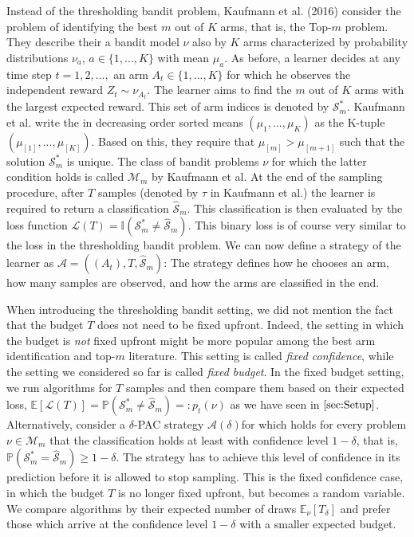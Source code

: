 \documentclass[11pt,]{article}
\begin{document}
Instead of the thresholding bandit problem, Kaufmann et al. (2016)
consider the problem of identifying the best \(m\) out of \(K\) arms,
that is, the Top-\(m\) problem. They describe their a bandit model
\(\nu\) also by \(K\) arms characterized by probability distributions
\(\nu_a\), \(a \in \{1,...,K\}\) with mean \(\mu_a\). As before, a
learner decides at any time step \(t=1,2,...,\) an arm
\(A_t \in \{1,...,K\}\) for which he observes the independent reward
\(Z_{t} \sim \nu_{A_t}\). The learner aims to find the \(m\) out of
\(K\) arms with the largest expected reward. This set of arm indices is
denoted by \(\mathcal{S}_m^*\). Kaufmann et al. write the in decreasing
order sorted means \((\mu_{1}, ..., \mu_{K})\) as the K-tuple
\((\mu_{[1]}, ..., \mu_{[K]})\). Based on this, they require that
\(\mu_{[m]} > \mu_{[m+1]}\) such that the solution \(\mathcal{S}_m^*\)
is unique. The class of bandit problems \(\nu\) for which the latter
condition holds is called \(\mathcal{M}_m\) by Kaufmann et al. At the
end of the sampling procedure, after \(T\) samples (denoted by \(\tau\)
in Kaufmann et al.) the learner is required to return a classification
\(\hat{\mathcal{S}}_m\). This classification is then evaluated by the
loss function
\(\mathcal{L}(T) = \mathbb{I}(\mathcal{S}^*_m \neq \hat{\mathcal{S}}_m)\).
This binary loss is of course very similar to the loss in the
thresholding bandit problem. We can now define a strategy of the learner
as \(\mathcal{A} = ((A_t), T, \hat{\mathcal{S}}_m)\): The strategy
defines how he chooses an arm, how many samples are observed, and how
the arms are classified in the end.

When introducing the thresholding bandit setting, we did not mention the
fact that the budget \(T\) does not need to be fixed upfront. Indeed,
the setting in which the budget is \emph{not} fixed upfront might be
more popular among the best arm identification and top-\(m\) literature.
This setting is called \emph{fixed confidence}, while the setting we
considered so far is called \emph{fixed budget}. In the fixed budget
setting, we run algorithms for \(T\) samples and then compare them based
on their expected loss,
\(\mathbb{E}[\mathcal{L}(T)] = \mathbb{P}(\mathcal{S}^*_m \neq \hat{\mathcal{S}}_m) =: p_t(\nu)\)
as we have seen in \(\autoref{sec:Setup}\). Alternatively, consider a
\(\delta\)-PAC strategy \(\mathcal{A}(\delta)\)for which holds for every
problem \(\nu \in \mathcal{M}_m\) that the classification holds at least
with confidence level \(1-\delta\), that is,
\(\mathbb{P}(\mathcal{S}^*_m = \hat{\mathcal{S}}_m) \geq 1-\delta\). The
strategy has to achieve this level of confidence in its prediction
before it is allowed to stop sampling. This is the fixed confidence
case, in which the budget \(T\) is no longer fixed upfront, but becomes
a random variable. We compare algorithms by their expected number of
draws \(\mathbb{E}_{\nu}[T_{\delta}]\) and prefer those which arrive at
the confidence level \(1-\delta\) with a smaller expected budget.
\end{document}
